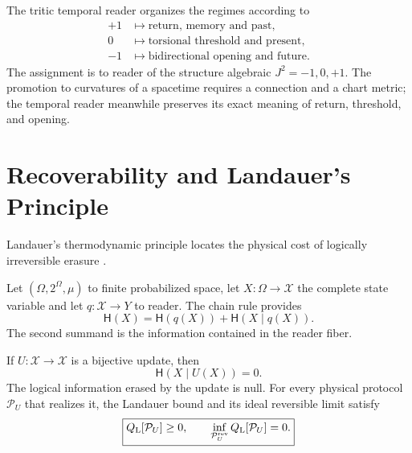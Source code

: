 The tritic temporal reader organizes the regimes according to
\begin{equation}
 \begin{aligned}
 +1&\longmapsto\text{return, memory and past},\\
 0&\longmapsto\text{torsional threshold and present},\\
 -1&\longmapsto\text{bidirectional opening and future}.
 \end{aligned}
 \label{eq:rm-obs-temporal-trit}
\end{equation}
The assignment is to reader of the structure algebraic
\(J^2=-1,0,+1\). The promotion to curvatures of a spacetime requires a
connection and a chart metric; the temporal reader meanwhile preserves
its exact meaning of return, threshold, and opening.

\section{Recoverability and Landauer's Principle}

Landauer's thermodynamic principle locates the physical cost of
logically irreversible erasure \cite{Landauer1961}.

Let \((\Omega,2^\Omega,\mu)\) to finite probabilized space, let
\(X:\Omega\to\mathcal X\) the complete state variable and let
\(q:\mathcal X\to Y\) to reader. The chain rule provides
\begin{equation}
 \mathsf H(X)
 =\mathsf H(q(X))+\mathsf H(X\mid q(X)).
 \label{eq:rm-obs-entropy-chain}
\end{equation}
The second summand is the information contained in the reader fiber.

\begin{theorem}
\label{thm:rm-obs-zero-landauer}
If \(U:\mathcal X\to\mathcal X\) is a bijective update, then
\begin{equation}
 \boxed{\mathsf H(X\mid U(X))=0.}
 \label{eq:rm-obs-zero-conditional-entropy}
\end{equation}
The logical information erased by the update is null. For every
physical protocol \(\mathcal P_U\) that realizes it, the Landauer bound and its
ideal reversible limit satisfy
\begin{equation}
 \boxed{
 Q_{\rm L}[\mathcal P_U]\geq0,
 \qquad
 \inf_{\mathcal P_U^{\rm rev}}Q_{\rm L}[\mathcal P_U]=0.}
 \label{eq:rm-obs-zero-landauer-cost}
\end{equation}
\end{theorem}

